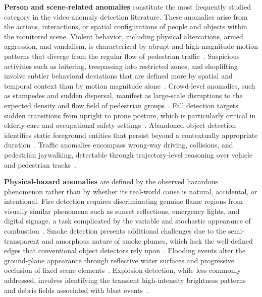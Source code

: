 \documentclass[10pt,a4paper]{article}
\begin{document}
\textbf{Person and scene-related anomalies} constitute the most frequently studied category in the video anomaly detection literature. These anomalies arise from the actions, interactions, or spatial configurations of people and objects within the monitored scene. Violent behavior, including physical altercations, armed aggression, and vandalism, is characterized by abrupt and high-magnitude motion patterns that diverge from the regular flow of pedestrian traffic~\citep{sultani2018real}. Suspicious activities such as loitering, trespassing into restricted zones, and shoplifting involve subtler behavioral deviations that are defined more by spatial and temporal context than by motion magnitude alone~\citep{liu2018future}. Crowd-level anomalies, such as stampedes and sudden dispersal, manifest as large-scale disruptions to the expected density and flow field of pedestrian groups~\citep{li2015crowded}. Fall detection targets sudden transitions from upright to prone posture, which is particularly critical in elderly care and occupational safety settings~\citep{nogas2020deepfall}. Abandoned object detection identifies static foreground entities that persist beyond a contextually appropriate duration~\citep{luna2018abandoned}. Traffic anomalies encompass wrong-way driving, collisions, and pedestrian jaywalking, detectable through trajectory-level reasoning over vehicle and pedestrian tracks~\citep{santhosh2020traffic}.

\textbf{Physical-hazard anomalies} are defined by the observed hazardous phenomenon rather than by whether its real-world cause is natural, accidental, or intentional. Fire detection requires discriminating genuine flame regions from visually similar phenomena such as sunset reflections, emergency lights, and digital signage, a task complicated by the variable and stochastic appearance of combustion~\citep{muhammad2019efficient}. Smoke detection presents additional challenges due to the semi-transparent and amorphous nature of smoke plumes, which lack the well-defined edges that conventional object detectors rely upon~\citep{chen2022fire}. Flooding events alter the ground-plane appearance through reflective water surfaces and progressive occlusion of fixed scene elements~\citep{liang2023vfloodnet}. Explosion detection, while less commonly addressed, involves identifying the transient high-intensity brightness patterns and debris fields associated with blast events~\citep{lopez2018emergency}.
\end{document}
